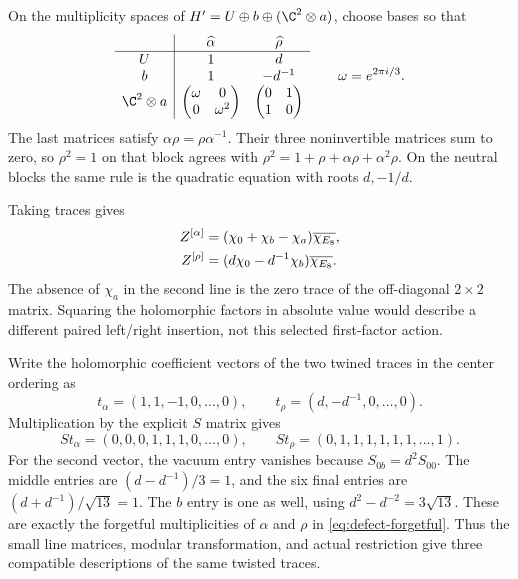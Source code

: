 On the multiplicity spaces of
$H'=U\oplus b\oplus(\C^2\otimes a)$, choose bases so that
\begin{equation}
\begin{array}{c|cc}
 &\widehat\alpha&\widehat\rho\\\hline
 U&1&d\\
 b&1&-d^{-1}\\
 \C^2\otimes a&
 \begin{pmatrix}\omega&0\\0&\omega^2\end{pmatrix}&
 \begin{pmatrix}0&1\\1&0\end{pmatrix}
\end{array}
\qquad\omega=e^{2\pi i/3}.
 \label{eq:defect-H3-action}
\end{equation}
The last matrices satisfy
$\alpha\rho=\rho\alpha^{-1}$. Their three noninvertible
matrices sum to zero, so $\rho^2=1$ on that block agrees with
$\rho^2=1+\rho+\alpha\rho+\alpha^2\rho$.
On the neutral blocks the same rule is the quadratic equation
with roots $d,-1/d$.

Taking traces gives
\begin{align}
 Z^{[\alpha]}&=(\chi_0+\chi_b-\chi_a)
                                     \overline{\chi_{E_8}},\notag\\
 Z^{[\rho]}&=(d\chi_0-d^{-1}\chi_b)
                                     \overline{\chi_{E_8}}.
 \label{eq:defect-E8-twined}
\end{align}
The absence of $\chi_a$ in the second line is the zero trace of
the off-diagonal $2\times2$ matrix. Squaring the holomorphic
factors in absolute value would describe a different paired
left/right insertion, not this selected first-factor action.

\begin{example}
Write the holomorphic coefficient vectors of the two twined
traces in the center ordering as
\[
 t_\alpha=(1,1,-1,0,\ldots,0),\qquad
 t_\rho=(d,-d^{-1},0,\ldots,0).
\]
Multiplication by the explicit $S$ matrix gives
\[
 St_\alpha=(0,0,0,1,1,1,0,\ldots,0),\qquad
 St_\rho=(0,1,1,1,1,1,1,\ldots,1).
\]
For the second vector, the vacuum entry vanishes because
$S_{0b}=d^2S_{00}$. The middle entries are
$(d-d^{-1})/3=1$, and the six final entries are
$(d+d^{-1})/\sqrt{13}=1$.
The $b$ entry is one as well, using
$d^2-d^{-2}=3\sqrt{13}$.
These are exactly the forgetful multiplicities of $\alpha$
and $\rho$ in \eqref{eq:defect-forgetful}. Thus the small
line matrices, modular transformation, and actual restriction
give three compatible descriptions of the same twisted traces.
\end{example}

